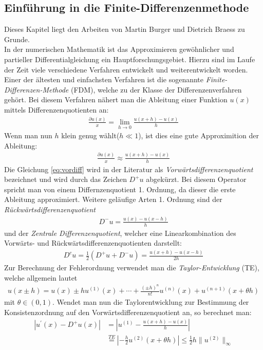\documentclass[a4paper,11pt]{article}
\begin{document}
\subsection{Einführung in die Finite-Differenzenmethode}
Dieses Kapitel liegt den Arbeiten von Martin Burger \cite{burger2006numerik} und Dietrich Braess \cite{braess2013finite} zu Grunde.\\
In der numerischen Mathematik ist das Approximieren gewöhnlicher und partieller Differentialgleichung ein Hauptforschungsgebiet. Hierzu sind im Laufe der Zeit viele verschiedene Verfahren entwickelt und weiterentwickelt worden. Einer der ältesten  und einfachsten Verfahren ist die sogenannte \textit{Finite-Differenzen-Methode} (FDM), welche zu der Klasse der Differenzenverfahren gehört. Bei diesem Verfahren nähert man die Ableitung einer Funktion $u(x)$ mittels Differenzenquotienten an:
\begin{align}
 \frac{\partial u(x)}{x}=\lim\limits_{h \rightarrow 0} \frac{u(x+h)-u(x)}{h}
\end{align}
Wenn man nun $h$ klein genug wählt($h\ll1$), ist dies eine gute Approximition der Ableitung:
\begin{align}
 \frac{\partial u(x)}{x}\approx \frac{u(x+h)-u(x)}{h}\label{eq:vordiff}
\end{align}
Die Gleichung \eqref{eq:vordiff} wird in der Literatur als \textit{Vorwärtsdifferenzenquotient} bezeichnet und wird durch das Zeichen $D^+u$ abgekürzt. Bei diesem Operator spricht man von einem Differnzenquotient 1. Ordnung, da dieser die erste Ableitung approximiert. Weitere geläufige Arten 1. Ordnung sind der \textit{Rückwärtsdifferenzenquotient}
\begin{align}
 D^-u= \frac{u(x)-u(x-h)}{h}
\end{align}
und der \textit{Zentrale Differenzenquotient}, welcher eine Linearkombination des Vorwärts- und Rückwärtsdifferenzenquotienten darstellt:
\begin{align}
 D^cu=\frac{1}{2}(D^+u+D^-u)= \frac{u(x+h)-u(x-h)}{2h}
\end{align}
Zur Berechnung der Fehlerordnung verwendet man die \textit{Taylor-Entwicklung} (TE), welche allgemein lautet
\begin{align}
 u(x\pm h)=u(x)\pm hu^{(1)}(x)+\cdots+\frac{(\pm h)^n}{n!}u^{(n)}(x)+u^{(n+1)}(x+\theta h)
\end{align}
mit $\theta\in(0,1)$. Wendet man nun die Taylorentwicklung zur Bestimmung der Konsistenzordnung auf den Vorwärtsdifferenzenquotient an, so berechnet man:
\begin{align}
 |u^{'}(x)-D^+u(x)|&=|u^{(1)}-\frac{u(x+h)-u(x)}{h}|\nonumber\\&\overset{TE}{=}|-\frac{h}{2}u^{(2)}(x+\theta h)|\le\frac{1}{2} h\|u^{(2)}\|_{\infty}
\end{align}
\end{document}

